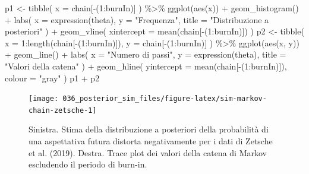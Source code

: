 \documentclass[
  10pt,
  italian,
  a4paper,
  extrafontsizes,onecolumn,openright
  ]{memoir}
\newenvironment{Shaded}{\begin{snugshade}}{\end{snugshade}}
\newcommand{\AttributeTok}[1]{\textcolor[rgb]{0.77,0.63,0.00}{#1}}
\newcommand{\DecValTok}[1]{\textcolor[rgb]{0.00,0.00,0.81}{#1}}
\newcommand{\FunctionTok}[1]{\textcolor[rgb]{0.00,0.00,0.00}{#1}}
\newcommand{\NormalTok}[1]{#1}
\newcommand{\OtherTok}[1]{\textcolor[rgb]{0.56,0.35,0.01}{#1}}
\newcommand{\SpecialCharTok}[1]{\textcolor[rgb]{0.00,0.00,0.00}{#1}}
\newcommand{\StringTok}[1]{\textcolor[rgb]{0.31,0.60,0.02}{#1}}
\begin{document}
\begin{Shaded}
\begin{Highlighting}[]
\NormalTok{p1 }\OtherTok{\textless{}{-}} \FunctionTok{tibble}\NormalTok{(}
  \AttributeTok{x =}\NormalTok{ chain[}\SpecialCharTok{{-}}\NormalTok{(}\DecValTok{1}\SpecialCharTok{:}\NormalTok{burnIn)]}
\NormalTok{  ) }\SpecialCharTok{\%\textgreater{}\%}
  \FunctionTok{ggplot}\NormalTok{(}\FunctionTok{aes}\NormalTok{(x)) }\SpecialCharTok{+}
  \FunctionTok{geom\_histogram}\NormalTok{() }\SpecialCharTok{+}
  \FunctionTok{labs}\NormalTok{(}
    \AttributeTok{x =} \FunctionTok{expression}\NormalTok{(theta),}
    \AttributeTok{y =} \StringTok{"Frequenza"}\NormalTok{,}
    \AttributeTok{title =} \StringTok{"Distribuzione a posteriori"}
\NormalTok{  ) }\SpecialCharTok{+}
  \FunctionTok{geom\_vline}\NormalTok{(}
    \AttributeTok{xintercept =} \FunctionTok{mean}\NormalTok{(chain[}\SpecialCharTok{{-}}\NormalTok{(}\DecValTok{1}\SpecialCharTok{:}\NormalTok{burnIn)])}
\NormalTok{  )}
\NormalTok{p2 }\OtherTok{\textless{}{-}} \FunctionTok{tibble}\NormalTok{(}
  \AttributeTok{x =} \DecValTok{1}\SpecialCharTok{:}\FunctionTok{length}\NormalTok{(chain[}\SpecialCharTok{{-}}\NormalTok{(}\DecValTok{1}\SpecialCharTok{:}\NormalTok{burnIn)]),}
  \AttributeTok{y =}\NormalTok{ chain[}\SpecialCharTok{{-}}\NormalTok{(}\DecValTok{1}\SpecialCharTok{:}\NormalTok{burnIn)]}
\NormalTok{  ) }\SpecialCharTok{\%\textgreater{}\%}
  \FunctionTok{ggplot}\NormalTok{(}\FunctionTok{aes}\NormalTok{(x, y)) }\SpecialCharTok{+}
  \FunctionTok{geom\_line}\NormalTok{() }\SpecialCharTok{+}
  \FunctionTok{labs}\NormalTok{(}
    \AttributeTok{x =} \StringTok{"Numero di passi"}\NormalTok{,}
    \AttributeTok{y =} \FunctionTok{expression}\NormalTok{(theta),}
    \AttributeTok{title =} \StringTok{"Valori della catena"}
\NormalTok{  ) }\SpecialCharTok{+}
  \FunctionTok{geom\_hline}\NormalTok{(}
    \AttributeTok{yintercept =} \FunctionTok{mean}\NormalTok{(chain[}\SpecialCharTok{{-}}\NormalTok{(}\DecValTok{1}\SpecialCharTok{:}\NormalTok{burnIn)]),}
    \AttributeTok{colour =} \StringTok{"gray"}
\NormalTok{  )}
\NormalTok{p1 }\SpecialCharTok{+}\NormalTok{ p2}
\end{Highlighting}
\end{Shaded}

\begin{figure}[h]

{\centering \texttt{[image: 036\_posterior\_sim\_files/figure-latex/sim-markov-chain-zetsche-1]} 

}

\caption{Sinistra. Stima della distribuzione a posteriori della probabilità di una aspettativa futura distorta negativamente per i dati di Zetsche et al. (2019). Destra. Trace plot dei valori della catena di Markov escludendo il periodo di burn-in.}\label{fig:sim-markov-chain-zetsche}
\end{figure}
\end{document}
